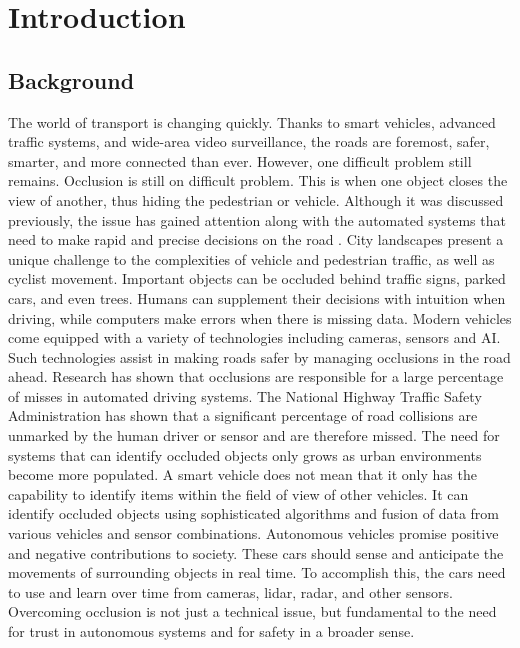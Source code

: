 \documentclass[12pt,a4paper]{report}
\theoremstyle{definition}
\theoremstyle{remark}
\begin{document}
\newpage

\pagestyle{chapterstyle} %

\chapter{Introduction}

\section{Background}
The world of transport is changing quickly. Thanks to smart vehicles, advanced traffic systems, and wide-area video surveillance, the roads are foremost, safer, smarter, and more connected than ever. However, one difficult problem still remains. Occlusion is still on difficult problem. This is when one object closes the view of another, thus hiding the pedestrian or vehicle. Although it was discussed previously, the issue has gained attention along with the automated systems that need to make rapid and precise decisions on the road \cite{paper1}. City landscapes present a unique challenge to the complexities of vehicle and pedestrian traffic, as well as cyclist movement. Important objects can be occluded behind traffic signs, parked cars, and even trees. Humans can supplement their decisions with intuition when driving, while computers make errors when there is missing data. Modern vehicles come equipped with a variety of technologies including cameras, sensors and AI. Such technologies assist in making roads safer by managing occlusions in the road ahead. Research has shown that occlusions are responsible for a large percentage of misses in automated driving systems. The National Highway Traffic Safety Administration has shown that a significant percentage of road collisions are unmarked by the human driver or sensor and are therefore missed. The need for systems that can identify occluded objects only grows as urban environments become more populated. A smart vehicle does not mean that it only has the capability to identify items within the field of view of other vehicles. It can identify occluded objects using sophisticated algorithms and fusion of data from various vehicles and sensor combinations. Autonomous vehicles promise positive and negative contributions to society. These cars should sense and anticipate the movements of surrounding objects in real time.  To accomplish this, the cars need to use and learn over time from cameras, lidar, radar, and other sensors. Overcoming occlusion is not just a technical issue, but fundamental to the need for trust in autonomous systems and for safety in a broader sense. 
\end{document}
